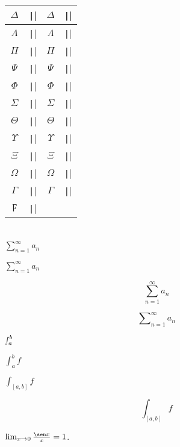 \begin{frame}
\begin{columns}
\begin{column}{.36\paperwidth}
\begin{table}[ht!]
\begin{tabular}{|cl|cl|}
					\hline
					$\Delta$   & \texttt|\Delta|   & $\varDelta$   & \texttt|\varDelta|   \\
					\hline
					$\Lambda$  & \texttt|\Lambda|  & $\varLambda$  & \texttt|\varLambda|  \\
					\hline
					$\Pi$      & \texttt|\Pi|      & $\varPi$      & \texttt|\varPi|      \\
					\hline
					$\Psi$     & \texttt|\Psi|     & $\varPsi$     & \texttt|\varPsi|     \\
					\hline
					$\Phi$     & \texttt|\Phi|     & $\varPhi$     & \texttt|\varPhi|     \\
					\hline
					$\Sigma$   & \texttt|\Sigma|   & $\varSigma$   & \texttt|\varSigma|   \\
					\hline
					$\Theta$   & \texttt|\Theta|   & $\varTheta$   & \texttt|\varTheta|   \\
					\hline
					$\Upsilon$ & \texttt|\Upsilon| & $\varUpsilon$ & \texttt|\varUpsilon| \\
					\hline
					$\Xi$      & \texttt|\Xi|      & $\varXi$      & \texttt|\varXi|      \\
					\hline
					$\Omega$   & \texttt|\Omega|   & $\varOmega$   & \texttt|\varOmega|   \\
					\hline
					$\Gamma$   & \texttt|\Gamma|   & $\varGamma$   & \texttt|\varGamma|   \\
					\hline
					$\digamma$ & \texttt|\digamma| &               &                                 \\
					\hline
				\end{tabular}
			\end{table}
		\end{column}
	\end{columns}
\end{frame}

\begin{frame}
	\frametitle{\secname}

	$\sum_{n=1}^{\infty}a_{n}$

	$\sum\limits_{n=1}^{\infty}a_{n}$

	\[\sum_{n=1}^{\infty}a_{n}\]

	\[\sum\nolimits_{n=1}^{\infty}a_{n}\]

	$\smallint_{a}^{b}$

	$\int_{a}^{b}f$

	$\int_{[a,b]}f$

	\[\int_{[a,b]}f\]

	$\lim_{x\to0}\frac{\sen x}{x}=1$.
\end{frame}
